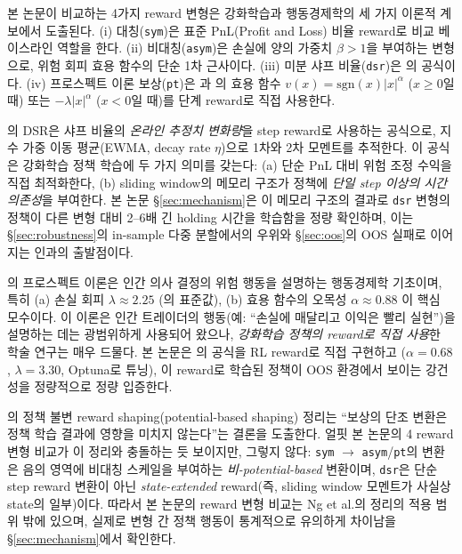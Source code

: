 \documentclass[11pt, a4paper]{article}
\begin{document}
본 논문이 비교하는 4가지 reward 변형은 강화학습과 행동경제학의 세 가지 이론적
계보에서 도출된다. (i) 대칭(\texttt{sym})은 표준 PnL(Profit and Loss) 비율 reward로 비교 베이스라인
역할을 한다. (ii) 비대칭(\texttt{asym})은 손실에 양의 가중치 $\beta>1$을 부여하는
변형으로, 위험 회피 효용 함수의 단순 1차 근사이다. (iii) 미분 샤프 비율(\texttt{dsr})은
\citet{moody2001dsr}의 공식이다. (iv) 프로스펙트 이론 보상(\texttt{pt})은
\citet{kahneman1979prospect}과 \citet{tversky1992cumulative}의 효용 함수
$v(x) = \mathrm{sgn}(x) |x|^\alpha$ ($x \geq 0$일 때) 또는
$-\lambda |x|^\alpha$ ($x < 0$일 때)를 단계 reward로 직접 사용한다.

\citet{moody2001dsr}의 DSR은 샤프 비율의 \emph{온라인 추정치 변화량}을 step reward로
사용하는 공식으로, 지수 가중 이동 평균(EWMA, decay rate $\eta$)으로 1차와 2차
모멘트를 추적한다. 이 공식은 강화학습 정책 학습에 두 가지 의미를 갖는다: (a) 단순
PnL 대비 위험 조정 수익을 직접 최적화한다, (b) sliding window의 메모리 구조가
정책에 \emph{단일 step 이상의 시간 의존성}을 부여한다. 본 논문 §\ref{sec:mechanism}은
이 메모리 구조의 결과로 \texttt{dsr} 변형의 정책이 다른 변형 대비 2--6배 긴
holding 시간을 학습함을 정량 확인하며, 이는 §\ref{sec:robustness}의 in-sample
다중 분할에서의 우위와 §\ref{sec:oos}의 OOS 실패로 이어지는 인과의 출발점이다.

\citet{kahneman1979prospect}의 프로스펙트 이론은 인간 의사 결정의 위험 행동을
설명하는 행동경제학 기초이며, 특히 (a) 손실 회피 $\lambda \approx 2.25$
(\citealt{tversky1992cumulative}의 표준값), (b) 효용 함수의 오목성 $\alpha \approx 0.88$
이 핵심 모수이다. 이 이론은 인간 트레이더의 행동(예: ``손실에 매달리고 이익은 빨리
실현'')을 설명하는 데는 광범위하게 사용되어 왔으나, \emph{강화학습 정책의
reward로 직접 사용}한 학술 연구는 매우 드물다. 본 논문은 \citet{kahneman1979prospect}의
공식을 RL reward로 직접 구현하고 ($\alpha=0.68$, $\lambda=3.30$, Optuna로 튜닝),
이 reward로 학습된 정책이 OOS 환경에서 보이는 강건성을 정량적으로
정량 입증한다.

\citet{ng1999reward}의 정책 불변 reward shaping(potential-based shaping) 정리는
``보상의 단조 변환은 정책 학습 결과에 영향을 미치지 않는다''는 결론을 도출한다.
얼핏 본 논문의 4 reward 변형 비교가 이 정리와 충돌하는 듯 보이지만, 그렇지
않다: \texttt{sym} $\to$ \texttt{asym}/\texttt{pt}의 변환은 음의 영역에 비대칭
스케일을 부여하는 \emph{비-potential-based} 변환이며, \texttt{dsr}은 단순 step
reward 변환이 아닌 \emph{state-extended} reward(즉, sliding window 모멘트가
사실상 state의 일부)이다. 따라서 본 논문의 reward 변형 비교는 Ng et al.의
정리의 적용 범위 밖에 있으며, 실제로 변형 간 정책 행동이 통계적으로 유의하게
차이남을 §\ref{sec:mechanism}에서 확인한다.
\end{document}
